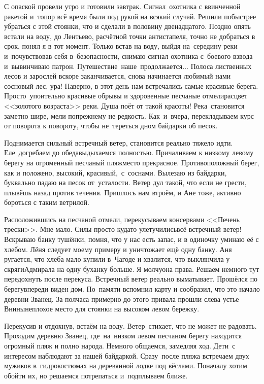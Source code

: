 С опаской провели утро и готовили завтрак. Сигнал~охотника с ввинченной ракетой и~топор всё время были под рукой на всякий случай. Решили побыстрее убраться с этой стоянки, что и сделали в половину двенадцатого. Поздно опять встали на воду, до Лентьево, расчётной точки антистапеля, точно не добраться в срок, понял я в тот момент. Только встав на воду, выйдя на~середину реки и~почувствовав себя в~безопасности, снимаю сигнал охотника с~боевого взвода и~вывинчиваю патрон. Путешествие~наше~продолжается$\ldots$
\newpage 
Полоса лиственных лесов и зарослей вскоре заканчивается, снова начинается любимый нами сосновый лес, ура! Наверно, в этот день нам встречались самые красивые берега. Просто~упоительно красивые обрывы и здоровенные песчаные отмели\mdash расцвет <<золотого возраста>> реки. Душа поёт от такой красоты! Река~становится заметно шире, мели по\sdash прежнему не редкость. Как~и~вчера, перекладываем курс от поворота к повороту, чтобы не~тереться дном байдарки об песок. 

Поднимается сильный встречный ветер, становится реально тяжело идти. Еле~догребаем до обеда\mdash выдыхаемся полностью. Причаливаем к низкому левому берегу на огроменный песчаный пляж\mdash место прекрасное. Противоположный берег, как и положено, высокий, красивый,~с~соснами. Вылезаю из байдарки, буквально падаю на песок от~усталости. Ветер дул такой, что если не грести, плывёшь назад против течения. Пришлось нам втроём, и Ане тоже, активно бороться с таким ветрилой. 

Расположившись на песчаной отмели, перекусываем консервами <<Печень трески>>. Мне мало. Силы просто куда\sdash то улетучились\mdash всё встречный ветер! Вскрываю банку тушёнки, помня, что у нас есть запас, и в одиночку уминаю её с хлебом. Лёня следует моему примеру и уничтожает ещё одну банку. Аня ругается, что хлеба мало купили в~Чагоде и хвалится, что выклянчила у скряги\sdash Адмирала на одну буханку больше. Я молчу\mdash она права. Решаем немного тут передохнуть после перекуса. Встречный ветер реально выматывает. Прошёлся по берегу\mdash впереди виден дом. По~памяти вспомнил карту и сообразил, что это начало деревни Званец. За полчаса примерно до этого привала прошли слева устье Внины\mdash неплохое место для стоянки на высоком левом бережку. 

Перекусив и отдохнув, встаём на воду. Ветер~стихает, что не может не радовать. Проходим деревню Званец, где~на~низком левом песчаном берегу находится огромный пляж и полно народа. Немного общаемся, замедляя ход. Дети~с интересом наблюдают за нашей байдаркой. Сразу~после пляжа встречаем двух мужиков в~гидрокостюмах на деревянной лодке под вёслами. Поначалу хотим обойти их, но решаемся потрепаться и~подплываем ближе. 

